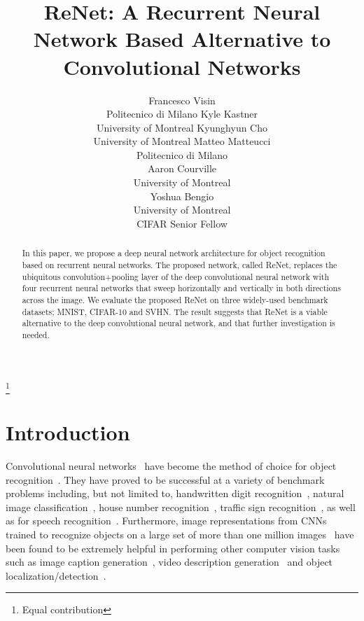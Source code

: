\documentclass{article} \usepackage{nips15submit_e,times}
\title{ReNet: A Recurrent Neural Network Based Alternative to Convolutional Networks}
\author{
    Francesco Visin \\
    Politecnico di Milano
\And
    Kyle Kastner \\
    University of Montreal
\And
    Kyunghyun Cho \\
    University of Montreal
\And
    Matteo Matteucci \\
    Politecnico di Milano \\
\And
    Aaron Courville \\
    University of Montreal \\
\And
    Yoshua Bengio \\
    University of Montreal \\
    CIFAR Senior Fellow
}
\begin{document}
{
\let\thefootnote\relax\footnote{ Equal contribution}
}



\maketitle

\begin{abstract}
    In this paper, we propose a deep neural network architecture for object
    recognition based on recurrent neural networks. The proposed network, called
    ReNet, replaces the ubiquitous convolution+pooling layer of the deep
    convolutional neural network with four recurrent neural networks that sweep
    horizontally and vertically in both directions across the image. We evaluate
    the proposed ReNet on three widely-used benchmark datasets; MNIST, CIFAR-10 
    and SVHN. The result suggests that ReNet is a viable alternative to the deep
    convolutional neural network, and that further investigation is needed.
\end{abstract}

\section{Introduction}
Convolutional neural networks~\cite[CNN,][]{Fukushima80,LeCun89} have become the
method of choice for object recognition~\citep[see, e.g.,][]{Krizhevsky-2012}.
They have proved to be successful at a variety of benchmark problems including,
but not limited to, handwritten digit recognition~\citep[see,
e.g.,][]{Ciresan-2012}, natural image classification~\citep[see,
e.g.,][]{Lin2014,Simonyan2015,szegedy2014going}, house number 
recognition~\citep[see, e.g.,][]{Goodfellow+et+al-ICLR2014a}, traffic sign
recognition~\citep[see, e.g.,][]{Ciresan-et-al-2012}, as well as for speech 
recognition~\citep[see, e.g.,][]{Hamid2012, sainath2013, toth2014combining}. 
Furthermore, image representations from CNNs trained to recognize objects on a 
large set of more than one million images~\citep{Simonyan2015,szegedy2014going} 
have been found to be extremely helpful in performing other computer vision
tasks such as image caption generation~\citep[see,
e.g.,][]{Vinyals-et-al-arxiv2014,Xu-et-al-arxiv2015}, video description
generation~\citep[see, e.g.,][]{Li2015} and object
localization/detection~\citep[see, e.g.,][]{Sermanet14}.
\end{document}
